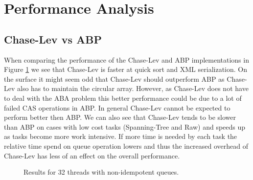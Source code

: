 \section{Performance Analysis}
\label{sec:performance_analysis}
\subsection{Chase-Lev vs ABP}
When comparing the performance of the Chase-Lev and ABP implementations in Figure \ref{fig:32nonidem} we see that Chase-Lev is faster at quick sort and XML serialization. On the surface it might seem odd that Chase-Lev should outperform ABP as Chase-Lev also has to maintain the circular array. However, as Chase-Lev does not have to deal with the ABA problem this better performance could be due to a lot of failed CAS operations in ABP\@. In general Chase-Lev cannot be expected to perform better then ABP\@. We can also see that Chase-Lev tends to be slower than ABP on cases with low cost tasks (Spanning-Tree and Raw) and speeds up as tasks become more work intensive. If more time is needed by each task the relative time spend on queue operation lowers and thus the increased overhead of Chase-Lev has less of an effect on the overall performance.

\begin{figure}
\caption{Results for 32 threads with non-idempotent queues.}
\label{fig:32nonidem}
\end{figure}

